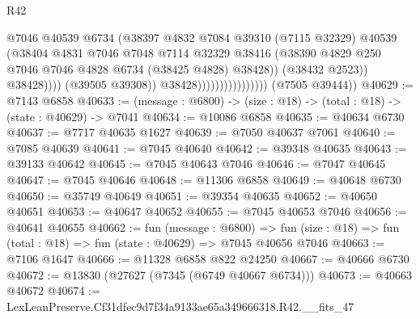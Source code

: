 \begin{lexlean}{R42}
\begin{coremodule}
{                                                @7046
                                                @40539
                                                @6734
                                                (@38397
                                                  @4832
                                                  @7084
                                                  @39310
                                                  (@7115 @32329)
                                                  @40539
                                                  (@38404
                                                    @4831
                                                    @7046
                                                    @7048
                                                    @7114
                                                    @32329
                                                    @38416
                                                    (@38390
                                                      @4829
                                                      @250
                                                      @7046
                                                      @7046
                                                      @4828
                                                      @6734
                                                      (@38425 @4828)
                                                      @38428))
                                                  (@38432 @2523))
                                                @38428))))
                                        (@39505 @39308))
                                      @38428))))))))))))))))
      (@7505 @39444))
@40629 := @7143 @6858
@40633 := (message : @6800) -> (size : @18) -> (total : @18) -> (state : @40629) -> @7041
@40634 := @10086 @6858
@40635 := @40634 @6730
@40637 := @7717 @40635 @1627
@40639 := @7050 @40637 @7061
@40640 := @7085 @40639
@40641 := @7045 @40640
@40642 := @39348 @40635
@40643 := @39133 @40642
@40645 := @7045 @40643 @7046
@40646 := @7047 @40645
@40647 := @7045 @40646
@40648 := @11306 @6858
@40649 := @40648 @6730
@40650 := @35749 @40649
@40651 := @39354 @40635
@40652 := @40650 @40651
@40653 := @40647 @40652
@40655 := @7045 @40653 @7046
@40656 := @40641 @40655
@40662 := fun (message : @6800) =>
  fun (size : @18) => fun (total : @18) => fun (state : @40629) => @7045 @40656 @7046
@40663 := @7106 @1647
@40666 := @11328 @6858 @822 @24250
@40667 := @40666 @6730
@40672 := @13830 (@27627 (@7345 (@6749 @40667 @6734)))
@40673 := @40663 @40672
@40674 := LexLeanPreserve.Cf31dfec9d7f34a9133ae65a349666318.R42.__fits_47
}
\end{coremodule}
\end{lexlean}
